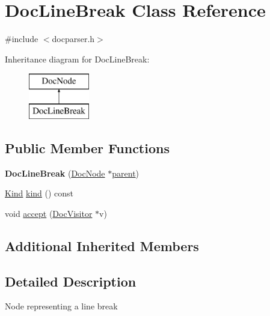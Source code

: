 \hypertarget{class_doc_line_break}{}\section{Doc\+Line\+Break Class Reference}
\label{class_doc_line_break}


{\ttfamily \#include $<$docparser.\+h$>$}

Inheritance diagram for Doc\+Line\+Break\+:\begin{figure}[H]
\begin{center}
\leavevmode
\includegraphics[height=2.000000cm]{class_doc_line_break}
\end{center}
\end{figure}
\subsection*{Public Member Functions}
\begin{DoxyCompactItemize}
\item 
\mbox{\label{class_doc_line_break_a1c48d51e307e4282afdcf33ed94b6c01}} 
{\bfseries Doc\+Line\+Break} (\mbox{\hyperlink{class_doc_node}{Doc\+Node}} $\ast$\mbox{\hyperlink{class_doc_node_a73e8ad29a91cfceb0968eb00db71a23d}{parent}})
\item 
\mbox{\hyperlink{class_doc_node_aebd16e89ca590d84cbd40543ea5faadb}{Kind}} \mbox{\hyperlink{class_doc_line_break_a1de15f513561ed6a15cad2fdc3b6e8c6}{kind}} () const
\item 
void \mbox{\hyperlink{class_doc_line_break_aa5f5795df35745cb45db9e77aeda2186}{accept}} (\mbox{\hyperlink{class_doc_visitor}{Doc\+Visitor}} $\ast$v)
\end{DoxyCompactItemize}
\subsection*{Additional Inherited Members}


\subsection{Detailed Description}
Node representing a line break 

